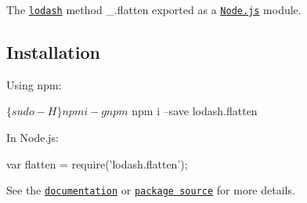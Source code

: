 The \href{https://lodash.com/}{\tt lodash} method {\ttfamily \+\_\+.\+flatten} exported as a \href{https://nodejs.org/}{\tt Node.\+js} module.

\subsection*{Installation}

Using npm\+: 
\begin{DoxyCode}
$ \{sudo -H\} npm i -g npm
$ npm i --save lodash.flatten
\end{DoxyCode}


In Node.\+js\+: 
\begin{DoxyCode}
var flatten = require('lodash.flatten');
\end{DoxyCode}


See the \href{https://lodash.com/docs#flatten}{\tt documentation} or \href{https://github.com/lodash/lodash/blob/4.4.0-npm-packages/lodash.flatten}{\tt package source} for more details. 